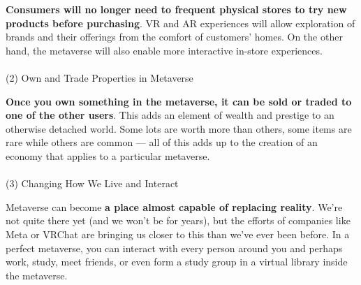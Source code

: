 \textbf{Consumers will no longer need to frequent physical stores to try new products before purchasing}. VR and AR experiences will allow exploration of brands and their offerings from the comfort of customers’ homes. On the other hand, the metaverse will also enable more interactive in-store experiences.
\\\\
(2)	Own and Trade Properties in Metaverse \cite{metaverseFuture2}

\textbf{Once you own something in the metaverse, it can be sold or traded to one of the other users}. This adds an element of wealth and prestige to an otherwise detached world. Some lots are worth more than others, some items are rare while others are common — all of this adds up to the creation of an economy that applies to a particular metaverse.
\\\\
(3)	Changing How We Live and Interact \cite{metaverseFuture2}

Metaverse can become \textbf{a place almost capable of replacing reality}. We’re not quite there yet (and we won’t be for years), but the efforts of companies like Meta or VRChat are bringing us closer to this than we’ve ever been before. In a perfect metaverse, you can interact with every person around you and perhaps work, study, meet friends, or even form a study group in a virtual library inside the metaverse.